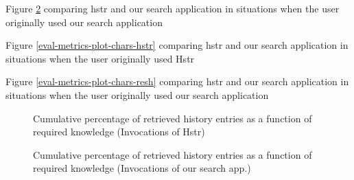 Figure \ref{eval-metrics-plot-cmds-resh} comparing hstr and our search application in situations when the user originally used our search application


Figure \ref{eval-metrics-plot-chars-hstr} comparing hstr and our search application in situations when the user originally used Hstr


Figure \ref{eval-metrics-plot-chars-resh} comparing hstr and our search application in situations when the user originally used our search application


\clearpage
\begin{figure}[h!]
\centering
{}
\caption{Cumulative percentage of retrieved history entries as a function of required knowledge (Invocations of Hstr)}
\label{eval-metrics-plot-cmds-hstr}
\end{figure}

\begin{figure}[h!]
\centering
{}
\caption{Cumulative percentage of retrieved history entries as a function of required knowledge (Invocations of our search app.)}
\label{eval-metrics-plot-cmds-resh}
\end{figure}


